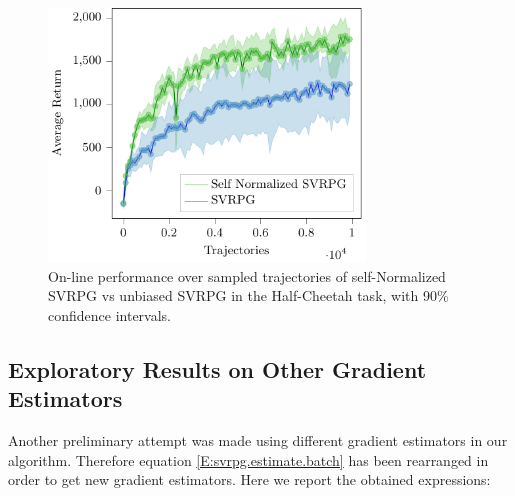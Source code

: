 \begin{figure}[h]
	\begin{minipage}[h]{1\textwidth}
		\centering
		\includegraphics[width=0.75\textwidth]{Images/Experiments/half_cheetah_SVRPG_vs_SN_SVRPG.pdf}
		\vspace{-0.1in}
		\caption{On-line performance over sampled trajectories of self-Normalized \acs{SVRPG} vs unbiased \acs{SVRPG} in the Half-Cheetah task, with 90\% confidence intervals.}
		\label{fig:hctwo}
	\end{minipage}
	\vspace{-0.15in}
\end{figure}

\subsection{Exploratory Results on Other Gradient Estimators}\label{subsec:oge}
Another preliminary attempt was made using different gradient estimators in our algorithm. Therefore equation \eqref{E:svrpg.estimate.batch} has been rearranged in order to get new gradient estimators. Here we report the obtained expressions:

